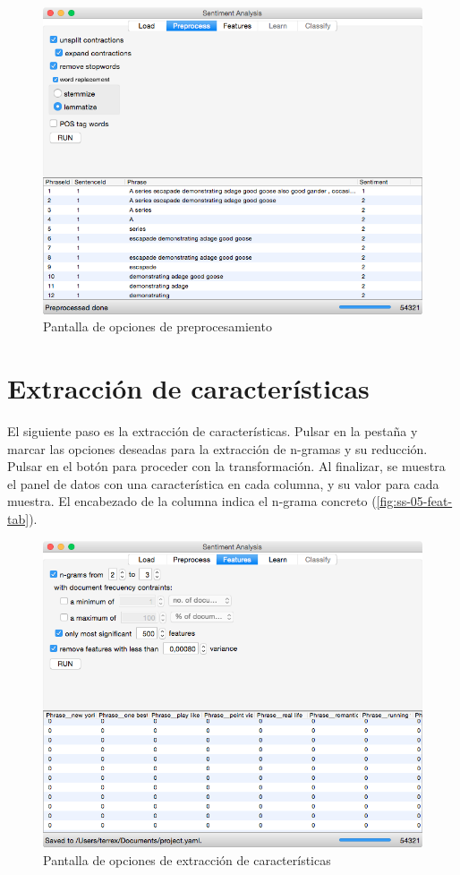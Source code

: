 \begin{figure}[H]
\centering
\includegraphics[width=14cm]{ss-04-preproc-tab}
\caption{Pantalla de opciones de preprocesamiento}
\label{fig:ss-04-preproc-tab}
\end{figure}

\newpage
\section{Extracción de características}
\label{sec:manual-features}

El siguiente paso es la extracción de características. Pulsar en la pestaña y marcar las opciones deseadas para la extracción de n-gramas y su reducción. Pulsar en el botón  para proceder con la transformación. Al finalizar, se muestra el panel de datos con una característica en cada columna, y su valor para cada muestra. El encabezado de la columna indica el n-grama concreto (\autoref{fig:ss-05-feat-tab}).

\begin{figure}[H]
\centering
\includegraphics[width=14cm]{ss-05-feat-tab}
\caption{Pantalla de opciones de extracción de características}
\label{fig:ss-05-feat-tab}
\end{figure}

